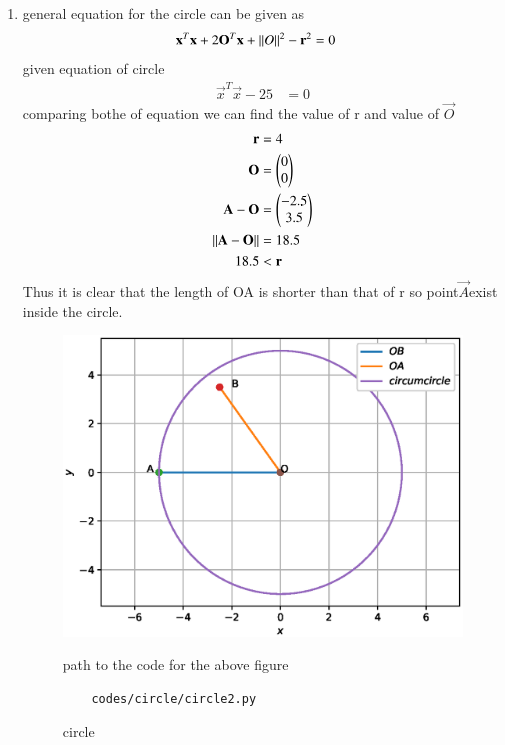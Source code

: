 \renewcommand{\theequation}{\theenumi}
\begin{enumerate}[label=\arabic*.,ref=\thesubsection.\theenumi]

\item general equation for the circle can be given as
\begin{align}
\mathbf{x}^T\mathbf{x} + 2\mathbf{O}^T\mathbf{x} +\left\lVert O\right\rVert^2 - \mathbf{r}^2 &= 0
\end{align}
given equation of circle
\begin{align}
\vec{x}^T\vec{x} -25&= 0
\end{align} 
comparing bothe of equation we can find the value of r and value of  $\vec{O}$
\begin{align}
\mathbf{r}&= 4
\\
\mathbf{O} &= \begin{pmatrix}0\\0\end{pmatrix}
\\
\mathbf{A}-\mathbf{O} &= \begin{pmatrix}-2.5\\3.5\end{pmatrix}
\\
\left\lVert\mathbf{A} - \mathbf{O}\right\rVert &= 18.5
\\ 18.5 &\textless \mathbf{r}
\end{align} 
Thus it is clear that the length of OA is shorter than that of r so point$\vec{A} $exist inside the circle.
\begin{figure}[!ht]
	\centering
	\includegraphics[width=\columnwidth]{./figures/circle/circle2.eps}
	\caption{circle }
	\label{fig:circle}
	path to the code for the above figure
	\begin{lstlisting}
	codes/circle/circle2.py
	\end{lstlisting}
\end{figure}
\end{enumerate}